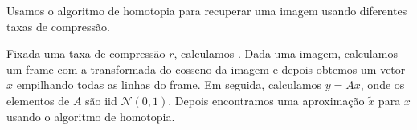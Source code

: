 Usamos o algoritmo de homotopia para recuperar uma imagem usando diferentes taxas de compressão.

Fixada uma taxa de compressão $r$, calculamos . Dada uma imagem, calculamos um frame com a transformada do cosseno da imagem e depois obtemos um vetor $x$ empilhando todas as linhas do frame. Em seguida, calculamos $y = Ax$, onde os elementos de $A$ são iid $\mathcal{N}(0,1)$. Depois encontramos uma aproximação $\tilde{x}$ para $x$ usando o algoritmo de homotopia.


